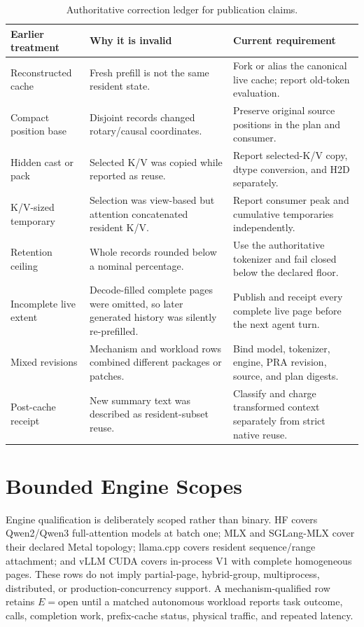 \documentclass[11pt]{article}
\begin{document}
\begin{table}[H]
\centering
\footnotesize
\begin{tabularx}{\linewidth}{p{.27\linewidth}p{.30\linewidth}Y}
\toprule
Earlier treatment & Why it is invalid & Current requirement \\
\midrule
Reconstructed cache & Fresh prefill is not the same resident state. & Fork or alias the canonical live cache; report old-token evaluation. \\
Compact position base & Disjoint records changed rotary/causal coordinates. & Preserve original source positions in the plan and consumer. \\
Hidden cast or pack & Selected K/V was copied while reported as reuse. & Report selected-K/V copy, dtype conversion, and H2D separately. \\
K/V-sized temporary & Selection was view-based but attention concatenated resident K/V. & Report consumer peak and cumulative temporaries independently. \\
Retention ceiling & Whole records rounded below a nominal percentage. & Use the authoritative tokenizer and fail closed below the declared floor. \\
Incomplete live extent & Decode-filled complete pages were omitted, so later generated history was silently re-prefilled. & Publish and receipt every complete live page before the next agent turn. \\
Mixed revisions & Mechanism and workload rows combined different packages or patches. & Bind model, tokenizer, engine, PRA revision, source, and plan digests. \\
Post-cache receipt & New summary text was described as resident-subset reuse. & Classify and charge transformed context separately from strict native reuse. \\
\bottomrule
\end{tabularx}
\caption{Authoritative correction ledger for publication claims.}
\label{tab:short-correction-ledger}
\end{table}

\section{Bounded Engine Scopes}

Engine qualification is deliberately scoped rather than binary.  HF covers
Qwen2/Qwen3 full-attention models at batch one; MLX and SGLang-MLX cover their
declared Metal topology; llama.cpp covers resident sequence/range attachment;
and vLLM CUDA covers in-process V1 with complete homogeneous pages.  These
rows do not imply partial-page, hybrid-group, multiprocess, distributed, or
production-concurrency support.  A mechanism-qualified row retains
$E=\mathrm{open}$ until a matched autonomous workload reports task outcome,
calls, completion work, prefix-cache status, physical traffic, and repeated
latency.
\end{document}
